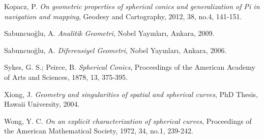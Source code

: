 \documentclass[a4paper,12pt]{article}
\begin{document}
\begin{thebibliography}{99}
 Kopacz, P. \textit{On geometric properties of spherical conics and generalization of Pi in navigation and mapping}, Geodesy and Cartography, 2012, 38, no.4, 141-151.

 Sabuncuoğlu, A. \textit{Analitik Geometri}, Nobel Yayınları, Ankara, 2009.

 Sabuncuoğlu, A. \textit{Diferensiyel Geometri}, Nobel Yayınları, Ankara, 2006.

 Sykes, G. S.; Peirce, B. \textit{Spherical Conics}, Proceedings of the American Academy of Arts and Sciences, 1878, 13, 375-395.

 Xiong, J. \textit{Geometry and singularities of spatial and spherical curves}, PhD Thesis, Hawaii University, 2004.

 Wong, Y. C. \textit{On an explicit characterization of spherical curves}, Proceedings of the American Mathematical Society, 1972, 34, no.1, 239-242.

\end{thebibliography}
\end{document}
